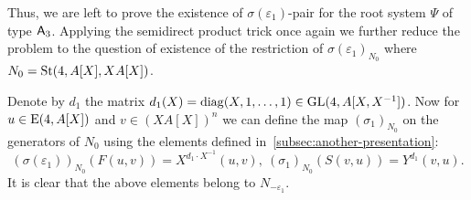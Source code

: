 Thus, we are left to prove the existence of $\sigma(\varepsilon_1)$-pair for the root system $\Psi$ of type $\mathsf{A}_3$.
Applying the semidirect product trick once again we further reduce the problem to the question of existence of the restriction of $\sigma(\varepsilon_1)_{N_0}$ where $N_0 = \operatorname{St}(4, A[X], XA[X])$.

Denote by $d_1$ the matrix $d_1(X) = \mathrm{diag}(X, 1, \ldots, 1) \in \operatorname{GL}(4, A[X, X^{-1}])$.
Now for $u \in \operatorname{E}(4, A[X])$ and $v \in (XA[X])^n$ we can define the map $(\sigma_1)_{N_0}$ on the generators of $N_{0}$
using the elements defined in~\cref{subsec:another-presentation}:
\begin{equation*}
(\sigma(\varepsilon_1))_{N_0} (F(u, v)) = X^{d_1 \cdot X^{-1}}(u, v),\ (\sigma_1)_{N_0} (S(v, u)) = Y^{d_1}(v, u).
\end{equation*}
It is clear that the above elements belong to $N_{-\varepsilon_1}$.

